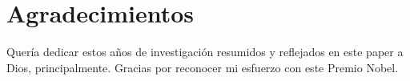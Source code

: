 \section*{Agradecimientos} 
\label{sec:agradecimientos} %
Quería dedicar estos años de investigación resumidos y reflejados en este paper a Dios, principalmente. Gracias por reconocer mi esfuerzo con este Premio Nobel. 
